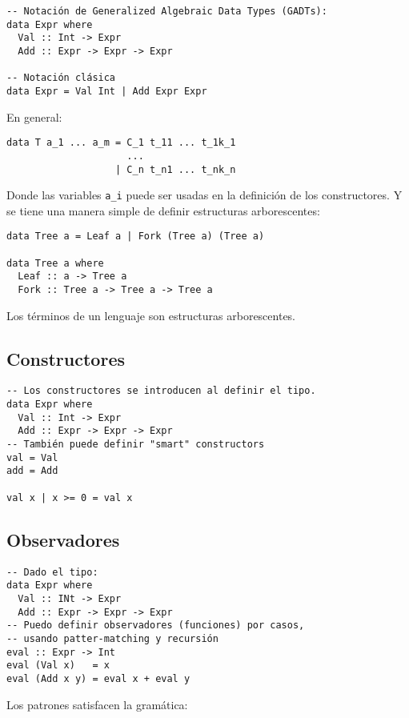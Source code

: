 \documentclass{article}
\begin{document}
\begin{lstlisting}
-- Notación de Generalized Algebraic Data Types (GADTs):
data Expr where
  Val :: Int -> Expr
  Add :: Expr -> Expr -> Expr
    
-- Notación clásica
data Expr = Val Int | Add Expr Expr
\end{lstlisting}

En general:
\begin{lstlisting}
data T a_1 ... a_m = C_1 t_11 ... t_1k_1
                     ...
                   | C_n t_n1 ... t_nk_n
\end{lstlisting}                   

Donde las variables \texttt{a\_i} puede ser usadas en la definición de los constructores. Y se tiene una manera simple de definir estructuras arborescentes:

\begin{lstlisting}
data Tree a = Leaf a | Fork (Tree a) (Tree a)

data Tree a where
  Leaf :: a -> Tree a
  Fork :: Tree a -> Tree a -> Tree a
\end{lstlisting}

Los términos de un lenguaje son estructuras arborescentes.

\subsection{Constructores}\label{subsec:gadts_constructores}

\begin{lstlisting}
-- Los constructores se introducen al definir el tipo.
data Expr where
  Val :: Int -> Expr
  Add :: Expr -> Expr -> Expr
-- También puede definir "smart" constructors
val = Val
add = Add
  
val x | x >= 0 = val x
\end{lstlisting}
\subsection{Observadores}\label{subsec:gadts_observadores}

\begin{lstlisting}
-- Dado el tipo:
data Expr where
  Val :: INt -> Expr
  Add :: Expr -> Expr -> Expr    
-- Puedo definir observadores (funciones) por casos, 
-- usando patter-matching y recursión
eval :: Expr -> Int
eval (Val x)   = x
eval (Add x y) = eval x + eval y
\end{lstlisting}

Los patrones satisfacen la gramática:
\end{document}
